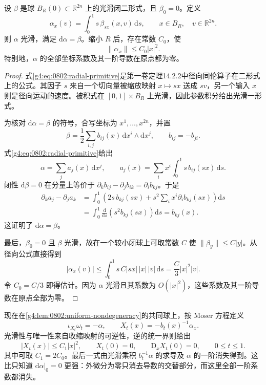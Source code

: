 \begin{lemma}
	\label{g4:lem:0802:radial-primitive}
	设 \(\beta\) 是球 \(B_R(0)\subset\mathbb R^{2n}\) 上的光滑闭二形式，且 \(\beta_0=0\)。定义
	\begin{equation}
		\label{g4:eq:0802:radial-primitive}
		\alpha_x(v)=\int_0^1 s\,\beta_{sx}(x,v)\,\mathrm{d}s,
		\qquad x\in B_R,\quad v\in\mathbb R^{2n}.
	\end{equation}
	则 \(\alpha\) 光滑，满足 \(\mathrm{d}\alpha=\beta\)。缩小 \(R\) 后，存在常数 \(C_0\)，使
	\[
		\|\alpha_x\|\le C_0|x|^2.
	\]
	特别地，\(\alpha\) 的全部坐标系数及其一阶导数在原点都为零。
\end{lemma}
\begin{proof}
	式\eqref{g4:eq:0802:radial-primitive}是第一卷定理14.2.2中径向同伦算子在二形式上的公式。其因子 \(s\) 来自一个切向量被缩放映射 \(x\mapsto sx\) 送成 \(sv\)，另一个输入 \(x\) 则是径向运动的速度。被积式在 \([0,1]\times B_R\) 上光滑，因此参数积分给出光滑一形式。

	为核对 \(\mathrm{d}\alpha=\beta\) 的符号，合写坐标为 \(x^1,\ldots,x^{2n}\)，并置
	\[
		\beta=\frac12\sum_{i,j}b_{ij}(x)\,\mathrm{d}x^i\wedge\mathrm{d}x^j,
		\qquad b_{ij}=-b_{ji}.
	\]
	式\eqref{g4:eq:0802:radial-primitive}给出
	\[
		\alpha=\sum_j a_j(x)\,\mathrm{d}x^j,\qquad
		a_j(x)=\sum_i x^i\int_0^1s\,b_{ij}(sx)\,\mathrm{d}s.
	\]
	闭性 \(\mathrm{d}\beta=0\) 在分量上等价于
	\(\partial_kb_{ij}-\partial_jb_{ik}=\partial_i b_{kj}\)。于是
	\[
		\begin{aligned}
			\partial_k a_j-\partial_j a_k
			&=\int_0^1\left(2s\,b_{kj}(sx)
				+s^2\sum_i x^i\partial_i b_{kj}(sx)\right)\mathrm{d}s\\
			&=\int_0^1\frac{\mathrm{d}}{\mathrm{d}s}
				\left(s^2b_{kj}(sx)\right)\mathrm{d}s=b_{kj}(x).
		\end{aligned}
	\]
	这证明了 \(\mathrm{d}\alpha=\beta\)。

	最后，\(\beta_0=0\) 且 \(\beta\) 光滑，故在一个较小闭球上可取常数 \(C\) 使 \(\|\beta_y\|\le C|y|\)。从径向公式直接得到
	\[
		|\alpha_x(v)|
		\le\int_0^1s\,C|sx|\,|x|\,|v|\,\mathrm{d}s
		=\frac C3|x|^2|v|.
	\]
	令 \(C_0=C/3\) 即得估计。因为 \(\alpha\) 光滑且其系数为 \(O(|x|^2)\)，这些系数及其一阶导数在原点全部为零。
\end{proof}

现在在\cref{g4:lem:0802:uniform-nondegeneracy}的共同球上，按 Moser 方程定义
\begin{equation}
	\label{g4:eq:0802:moser-field}
	\iota_{X_t}\omega_t=-\alpha,
	\qquad
	X_t(x)=-b_t(x)^{-1}\alpha_x.
\end{equation}
光滑性与唯一性来自收缩映射的可逆性，逆的统一界则给出
\begin{equation}
	\label{g4:eq:0802:field-estimate}
	|X_t(x)|\le C_1|x|^2,\qquad
	X_t(0)=0,\qquad
	\mathrm{D}_xX_t(0)=0,
	\qquad 0\le t\le1.
\end{equation}
其中可取 \(C_1=2C_0\)。最后一式由光滑乘积 \(b_t^{-1}\alpha\) 的求导及 \(\alpha\) 的一阶消失得到。这比只知道 \(\mathrm{d}\alpha|_0=0\) 更强：外微分为零只消去导数的交替部分，而这里全部一阶系数都消失。

